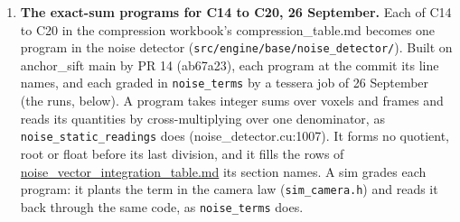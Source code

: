 \begin{enumerate}
\begin{itemize}
\item Reservation rule: 24 September (then held): “We reserve what they ask for and then if it cost less we remember that for next time”. tessera\_\allowbreak{}ledger\_\allowbreak{}wants is still in the working tree, waiting on his clarification. Not reverted.
\end{itemize}
\item \textbf{The exact-sum programs for C14 to C20, 26 September.} Each of C14 to C20 in the compression workbook's compression\_\allowbreak{}table.md becomes one program in the noise detector (\texttt{src/\allowbreak{}engine/\allowbreak{}base/\allowbreak{}noise\_\allowbreak{}detector/\allowbreak{}}). Built on anchor\_\allowbreak{}sift main by PR 14 (ab67a23), each program at the commit its line names, and each graded in \texttt{noise\_\allowbreak{}terms} by a tessera job of 26 September (the runs, below). A program takes integer sums over voxels and frames and reads its quantities by cross-multiplying over one denominator, as \texttt{noise\_\allowbreak{}static\_\allowbreak{}readings} does (noise\_\allowbreak{}detector.cu:1007). It forms no quotient, root or float before its last division, and it fills the rows of \hyperref[chap:noise-vector-integration-table]{noise\_\allowbreak{}vector\_\allowbreak{}integration\_\allowbreak{}table.md} its section names. A sim grades each program: it plants the term in the camera law (\texttt{sim\_\allowbreak{}camera.\allowbreak{}h}) and reads it back through the same code, as \texttt{noise\_\allowbreak{}terms} does.


\end{enumerate}

